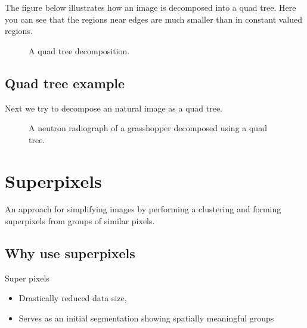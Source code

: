 \documentclass[letterpaper,10pt,english]{sphinxmanual}
\begin{document}
\sphinxAtStartPar
The figure below illustrates how an image is decomposed into a quad tree. Here you can see that the regions near edges are much smaller than in constant valued regions.

\begin{figure}[htbp]
\centering
\capstart

\noindent{}
\caption{A quad tree decomposition.}\label{\detokenize{05-AdvancedSegmentation:id5}}\end{figure}




\section{Quad tree example}
\label{\detokenize{05-AdvancedSegmentation:quad-tree-example}}
\sphinxAtStartPar
Next we try to decompose an natural image as a quad tree.

\begin{figure}[htbp]
\centering
\capstart

\noindent{}
\caption{A neutron radiograph of a grasshopper decomposed using a quad tree.}\label{\detokenize{05-AdvancedSegmentation:id6}}\end{figure}




\chapter{Superpixels}
\label{\detokenize{05-AdvancedSegmentation:superpixels}}
\sphinxAtStartPar
An approach for simplifying images by performing a clustering and forming super\sphinxhyphen{}pixels from groups of similar pixels.



\sphinxAtStartPar
{}


\section{Why use superpixels}
\label{\detokenize{05-AdvancedSegmentation:why-use-superpixels}}
\sphinxAtStartPar
Super pixels
\begin{itemize}
\item {} 
\sphinxAtStartPar
Drastically reduced data size,

\item {} 
\sphinxAtStartPar
Serves as an initial segmentation showing spatially meaningful groups

\end{itemize}
\end{document}
